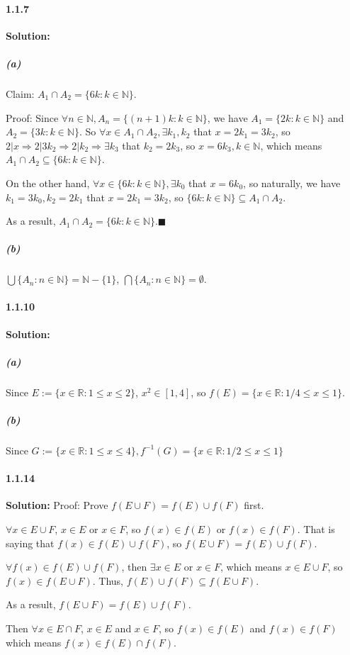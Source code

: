 \documentclass[11pt]{article}
\begin{document}
\paragraph{1.1.7}\textbf{Solution:}
	\subparagraph{(a)}
	 Claim: $A_1 \cap A_2 = \{6k: k \in \mathbb{N}\}$.
	 
	 Proof:
		Since $\forall n \in \mathbb{N}, A_n = \{(n + 1)k: k \in \mathbb{N}\}$, we have $A_1 = \{2k: k \in \mathbb{N}\}$ and $A_2 = \{3k: k \in \mathbb{N}\}$. So $\forall x \in A_1 \cap A_2, \exists k_1, k_2$ that $x = 2k_1 = 3k_2$, so $2 | x \Rightarrow 2 | 3k_2 \Rightarrow 2 | k_2 \Rightarrow \exists k_3$ that $k_2 = 2k_3$, so $x = 6k_3, k \in \mathbb{N}$, which means $A_1 \cap A_2 \subseteq \{6k: k \in \mathbb{N}\}$.
		
		On the other hand, $\forall x \in \{6k: k \in \mathbb{N}\}, \exists k_0$ that $x = 6k_0$, so naturally, we have $k_1 = 3k_0, k_2 = 2k_1$ that $x = 2k_1 = 3k_2$, so $\{6k: k \in \mathbb{N}\} \subseteq A_1 \cap A_2$.
		
		As a result, $A_1 \cap A_2 = \{6k: k \in \mathbb{N}\}$.$\blacksquare$
	\subparagraph{(b)}
	$\bigcup\{A_n: n \in \mathbb{N}\} = \mathbb{N} - \{1\}$, $\bigcap\{A_n: n \in \mathbb{N}\} = \emptyset$.
\paragraph{1.1.10}\textbf{Solution:}
	\subparagraph{(a)}
		Since $E := \{x \in \mathbb{R}: 1 \leq x \leq 2\}$, $x^2 \in [1, 4]$, so $f(E) = \{x \in \mathbb{R}: 1/4 \leq x \leq 1\}$.
	\subparagraph{(b)}
		Since $G := \{x \in \mathbb{R}: 1 \leq x \leq 4\}, f^{-1}(G) = \{x \in \mathbb{R}: 1/2 \leq x \leq 1\}$
\paragraph{1.1.14}\textbf{Solution:}
	Proof: 
		Prove $f(E \cup F) = f(E) \cup f(F)$ first.
		
		$\forall x \in E \cup F$, $x \in E$ or $x \in F$, so $f(x) \in f(E)$ or $f(x) \in f(F)$. That is saying that $f(x) \in f(E) \cup f(F)$, so $f(E \cup F) = f(E) \cup f(F)$.
		
		$\forall f(x) \in f(E) \cup f(F)$, then $\exists x \in E$ or $x \in F$, which means $x \in E \cup F$, so $f(x) \in f(E \cup F)$. Thus, $f(E) \cup f(F) \subseteq f(E \cup F)$.
		
		As a result, $f(E \cup F) = f(E) \cup f(F)$.
		
		Then $\forall x \in E \cap F$, $x \in E$ and $x \in F$, so $f(x) \in f(E)$ and $f(x) \in f(F)$ which means $f(x) \in f(E) \cap f(F)$.
		
\end{document}
